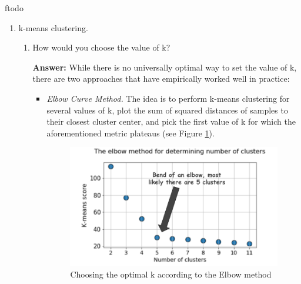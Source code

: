 ƒtodo\documentclass{article}
\newenvironment{QandA}{\begin{enumerate}[label=\arabic*.]}{\end{enumerate}}
\newenvironment{InnerQandA}{\begin{enumerate}[label=\roman*.]}{\end{enumerate}}
\newenvironment{answer}{\par\normalfont \textbf{Answer:}}{}
\begin{document}
\begin{QandA}
\begin{InnerQandA}
\begin{answer}
            (Source: \href{https://en.wikipedia.org/wiki/Feature_selection}{Wikipedia})
        \end{answer}
    \end{InnerQandA}

    \item k-means clustering.
    \begin{InnerQandA}
        \item How would you choose the value of k?
        \begin{answer}
            While there is no universally optimal way to set the value of k, there are two approaches that have empirically worked well in practice:
            \begin{itemize}
                \item \textit{Elbow Curve Method.} The idea is to perform k-means clustering for several values of k, plot the sum of squared distances of samples to their closest cluster center, and pick the first value of k for which the aforementioned metric plateaus (see Figure \ref{fig:elbow}).
                \begin{figure}[htb!]
                    \centering
                    \includegraphics[width=0.9\columnwidth]{img/elbow.png}
                    \caption{Choosing the optimal k according to the Elbow method \footnotemark }
                    \label{fig:elbow}
                \end{figure}


\end{itemize}
\end{answer}
\end{InnerQandA}
\end{QandA}
\end{document}
